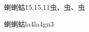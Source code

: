 \begin{entry}{蝲蝲蛄}{15,15,11}{⾍、⾍、⾍}
  \begin{phonetics}{蝲蝲蛄}{la4la4gu3}
  \end{phonetics}
\end{entry}
